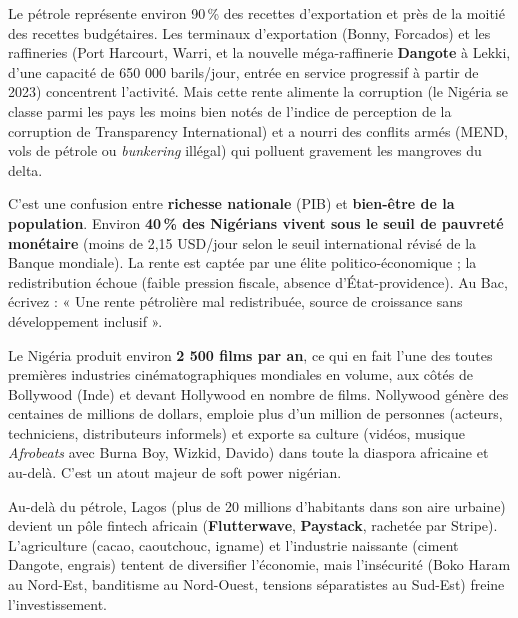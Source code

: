 \documentclass[11pt]{article}
\newcommand{\cle}[1]{{\popxbold\color{popdark}#1}}
\begin{document}
\begin{exemplebox}
Le pétrole représente environ 90\,\% des recettes d'exportation et près de la moitié des recettes budgétaires. Les terminaux d'exportation (Bonny, Forcados) et les raffineries (Port Harcourt, Warri, et la nouvelle méga-raffinerie \textbf{Dangote} à Lekki, d'une capacité de 650 000 barils/jour, entrée en service progressif à partir de 2023) concentrent l'activité. Mais cette rente alimente la corruption (le Nigéria se classe parmi les pays les moins bien notés de l'indice de perception de la corruption de Transparency International) et a nourri des conflits armés (MEND, vols de pétrole ou \emph{bunkering} illégal) qui polluent gravement les mangroves du delta.
\end{exemplebox}

\begin{attention}
C'est une confusion entre \textbf{richesse nationale} (PIB) et \textbf{bien-être de la population}. Environ \textbf{40\,\% des Nigérians vivent sous le seuil de pauvreté monétaire} (moins de 2,15 USD/jour selon le seuil international révisé de la Banque mondiale). La rente est captée par une élite politico-économique ; la redistribution échoue (faible pression fiscale, absence d'État-providence). Au Bac, écrivez : « Une rente pétrolière mal redistribuée, source de croissance sans développement inclusif ».
\end{attention}

\begin{savaistu}
Le Nigéria produit environ \textbf{2 500 films par an}, ce qui en fait l'une des toutes premières industries cinématographiques mondiales en volume, aux côtés de Bollywood (Inde) et devant Hollywood en nombre de films. \cle{Nollywood} génère des centaines de millions de dollars, emploie plus d'un million de personnes (acteurs, techniciens, distributeurs informels) et exporte sa culture (vidéos, musique \emph{Afrobeats} avec Burna Boy, Wizkid, Davido) dans toute la diaspora africaine et au-delà. C'est un atout majeur de \cle{soft power} nigérian.
\end{savaistu}

Au-delà du pétrole, Lagos (plus de 20 millions d'habitants dans son aire urbaine) devient un pôle \cle{fintech} africain (\textbf{Flutterwave}, \textbf{Paystack}, rachetée par Stripe). L'agriculture (cacao, caoutchouc, igname) et l'industrie naissante (ciment Dangote, engrais) tentent de diversifier l'économie, mais l'insécurité (Boko Haram au Nord-Est, banditisme au Nord-Ouest, tensions séparatistes au Sud-Est) freine l'investissement.
\end{document}
